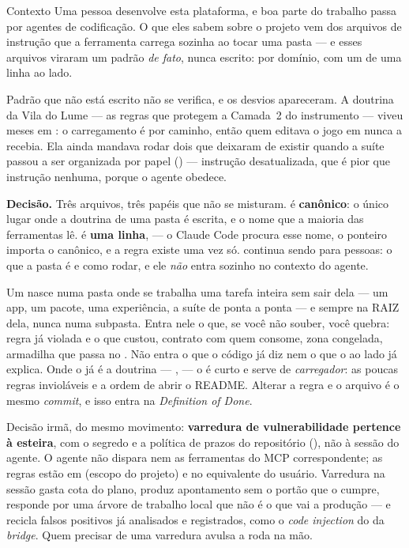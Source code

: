 \begin{especificacao}{Contexto}
Uma pessoa desenvolve esta plataforma, e boa parte do trabalho passa por agentes
de codificação. O que eles sabem sobre o projeto vem dos arquivos de instrução
que a ferramenta carrega sozinha ao tocar uma pasta --- e esses arquivos viraram
um padrão \emph{de fato}, nunca escrito:  por domínio, com um
 de uma linha ao lado.

Padrão que não está escrito não se verifica, e os desvios apareceram. A doutrina
da Vila do Lume --- as regras que protegem a Camada~2 do instrumento --- viveu
meses em : o carregamento é por caminho,
então quem editava o jogo em  nunca a recebia. Ela ainda
mandava rodar dois  que deixaram de existir
quando a suíte passou a ser organizada por papel () --- instrução
desatualizada, que é pior que instrução nenhuma, porque o agente obedece.
\end{especificacao}

\textbf{Decisão.} Três arquivos, três papéis que não se misturam.
 é \textbf{canônico}: o único lugar onde a doutrina de uma pasta é
escrita, e o nome que a maioria das ferramentas lê.  é
\textbf{uma linha},  --- o Claude Code procura esse nome, o
ponteiro importa o canônico, e a regra existe uma vez só. 
continua sendo para pessoas: o que a pasta é e como rodar, e ele \emph{não} entra
sozinho no contexto do agente.

Um  nasce numa pasta onde se trabalha uma tarefa inteira sem sair
dela --- um app, um pacote, uma experiência, a suíte de ponta a ponta --- e
sempre na RAIZ dela, nunca numa subpasta. Entra nele o que, se você não souber,
você quebra: regra já violada e o que custou, contrato com quem consome, zona
congelada, armadilha que passa no . Não entra o que o código já diz
nem o que o  ao lado já explica. Onde o  já é a
doutrina --- ,  --- o  é
curto e serve de \emph{carregador}: as poucas regras invioláveis e a ordem de
abrir o README. Alterar a regra e o arquivo é o mesmo \emph{commit}, e isso entra
na \emph{Definition of Done}.

Decisão irmã, do mesmo movimento: \textbf{varredura de vulnerabilidade pertence à
esteira}, com o segredo e a política de prazos do repositório
(), não à sessão do agente. O agente não dispara  nem as
ferramentas do MCP correspondente; as regras estão em 
(escopo do projeto) e no equivalente do usuário. Varredura na sessão gasta cota
do plano, produz apontamento sem o portão que o cumpre, responde por uma árvore
de trabalho local que não é o que vai a produção --- e recicla falsos positivos
já analisados e registrados, como o \emph{code injection} do  da
\emph{bridge}. Quem precisar de uma varredura avulsa a roda na mão.

